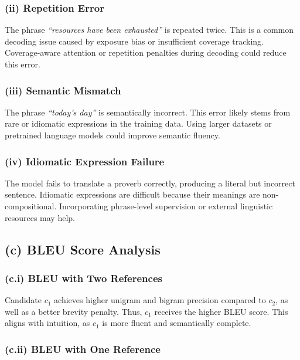 \documentclass[11pt]{article}
\begin{document}
\subsubsection*{(ii) Repetition Error}

The phrase \textit{“resources have been exhausted”} is repeated twice. This is a common decoding issue caused by exposure bias or insufficient coverage tracking. Coverage-aware attention or repetition penalties during decoding could reduce this error.

\subsubsection*{(iii) Semantic Mismatch}

The phrase \textit{“today’s day”} is semantically incorrect. This error likely stems from rare or idiomatic expressions in the training data. Using larger datasets or pretrained language models could improve semantic fluency.

\subsubsection*{(iv) Idiomatic Expression Failure}

The model fails to translate a proverb correctly, producing a literal but incorrect sentence. Idiomatic expressions are difficult because their meanings are non-compositional. Incorporating phrase-level supervision or external linguistic resources may help.

\subsection*{(c) BLEU Score Analysis}

\subsubsection*{(c.i) BLEU with Two References}

Candidate $c_1$ achieves higher unigram and bigram precision compared to $c_2$, as well as a better brevity penalty. Thus, $c_1$ receives the higher BLEU score. This aligns with intuition, as $c_1$ is more fluent and semantically complete.

\subsubsection*{(c.ii) BLEU with One Reference}
\end{document}
